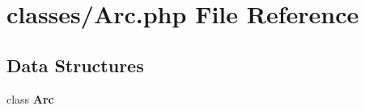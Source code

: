 \section{classes/\+Arc.php File Reference}
\label{_arc_8php}
\subsection*{Data Structures}
\begin{DoxyCompactItemize}
\item 
class \textbf{ Arc}
\end{DoxyCompactItemize}
